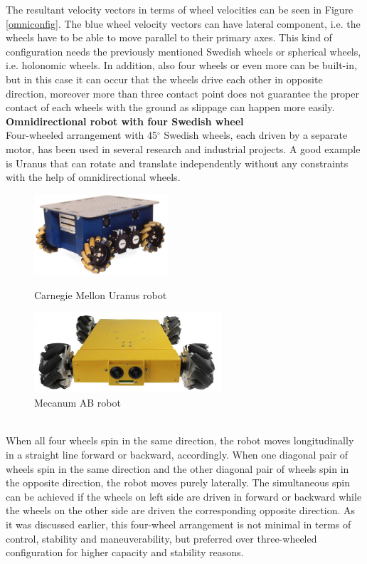 \documentclass[12pt,english,twoside]{article}
\begin{document}
The resultant velocity vectors in terms of wheel velocities can be seen in Figure \ref{omniconfig}. The blue wheel velocity vectors can have lateral component, i.e. the wheels have to be able to move parallel to their primary axes. This kind of configuration needs the previously mentioned Swedish wheels or spherical wheels, i.e. holonomic wheels. 
In addition, also four wheels or even more can be built-in, but in this case it can occur that the wheels drive each other in opposite direction, moreover more than three contact point does not guarantee the proper contact of each wheels with the ground as slippage can happen more easily.\\[10pt]
\noindent \textbf{Omnidirectional robot with four Swedish wheel} \\
Four-wheeled arrangement with 45$^{\circ}$ Swedish wheels, each driven by a separate motor, has been used in several research and industrial projects. A good example is Uranus that can rotate and translate independently without any constraints with the help of omnidirectional wheels.
\begin{figure}[htb!]
	\centering
	\centering
	\includegraphics[height=3cm]{figures/uranus}
	\caption{Carnegie Mellon Uranus robot \cite{rirt}}
	\endminipage\hfill
	\centering
	\includegraphics[height=3cm]{figures/mecanum}
	\caption{Mecanum AB robot \cite{rirt}}
	\label{mecanum}
	\endminipage\hfill
\end{figure} \\
When all four wheels spin in the same direction, the robot moves longitudinally in a straight line forward or backward, accordingly. When one diagonal pair of wheels spin in the same direction and the other diagonal pair of wheels spin in the opposite direction, the robot moves purely laterally. The simultaneous spin can be achieved if the wheels on left side are driven in forward or backward while the wheels on the other side are driven the corresponding opposite direction. As it was discussed earlier, this four-wheel arrangement is not minimal in terms of control, stability and maneuverability, but preferred over three-wheeled configuration for higher capacity and stability reasons. \\[10pt]
\end{document}
